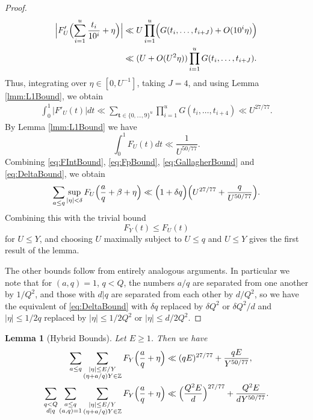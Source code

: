 \documentclass[10pt]{amsart}
\theoremstyle{plain}
\newtheorem{lmm}[thrm]{Lemma}
\numberwithin{sblmm}{thrm}
\numberwithin{equation}{section}
\begin{document}
\begin{proof}
%
\begin{align*}
\Bigl|F'_{U}\Bigl(\sum_{i=1}^u\frac{t_i}{10^i}+\eta\Bigr)\Bigr|
&\ll U \prod_{i=1}^u\Bigl( G(t_i,\dots,t_{i+J})+O(10^i\eta)\Bigr)\\
&\ll (U+O(U^2\eta))\prod_{i=1}^u G(t_i,\dots,t_{i+J}).
\end{align*}
%
Thus, integrating over $\eta\in[0,U^{-1}]$, taking $J=4$, and using Lemma \ref{lmm:L1Bound}, we obtain
%
\begin{align}
\int_0^1|F'_U(t)|d t\ll \sum_{\mathbf{t}\in\{0,\dots,9\}^u}\prod_{i=1}^u G(t_i,\dots,t_{i+4})\ll U^{27/77}.
\label{eq:FpBound}
\end{align}
By Lemma \ref{lmm:L1Bound} we have
\begin{equation}
\int_0^1F_U(t)d t\ll \frac{1}{U^{50/77}}.\label{eq:FIntBound}
\end{equation}
Combining \eqref{eq:FIntBound}, \eqref{eq:FpBound}, \eqref{eq:GallagherBound} and \eqref{eq:DeltaBound}, we obtain
\[
\sum_{a\le q}\sup_{|\eta|<\delta}F_U\Bigl(\frac{a}{q}+\beta+\eta\Bigr)\ll \Bigl(1+\delta q\Bigr)\Bigl(U^{27/77}+\frac{q}{U^{50/77}}\Bigr).
\]
%
Combining this with the trivial bound
\[
F_{Y}(t)\le F_{U}(t)
\]
for $U\le Y$, and choosing $U$ maximally subject to $U\le q$ and $U\le Y$  gives the first result of the lemma.

The other bounds follow from entirely analogous arguments. In particular we note that for $(a,q)=1$, $q<Q$, the numbers $a/q$ are separated from one another by $1/Q^2$, and those with $d|q$ are separated from each other by $d/Q^2$, so we have the equivalent of \eqref{eq:DeltaBound} with $\delta q$ replaced by $\delta Q^2$ or $\delta Q^2/d$ and $|\eta|\le 1/2q$ replaced by $|\eta|\le 1/2Q^2$ or $|\eta|\le d/2Q^2$.
%
\end{proof}
%
%
%
%
\begin{lmm}[Hybrid Bounds] \label{lmm:Hybrid}
%
Let $E\ge 1$. Then we have
%
\begin{align*}
\sum_{a\le q}\sum_{\substack{|\eta|\le E/Y\\ (\eta+a/q)Y\in\mathbb{Z}}}F_Y\Bigl(\frac{a}{q}+\eta\Bigr)&\ll (q E)^{27/77}+\frac{q E}{Y^{50/77}},\\
\sum_{\substack{q<Q\\ d|q}}\sum_{\substack{a\le q\\ (a,q)=1}}\sum_{\substack{|\eta|\le E/Y\\ (\eta+a/q)Y\in\mathbb{Z}}}F_Y\Bigl(\frac{a}{q}+\eta\Bigr)&\ll  \Bigl(\frac{Q^2E}{d}\Bigr)^{27/77}+\frac{Q^2E}{d Y^{50/77}}.
\end{align*}
%
\end{lmm}
\end{document}
